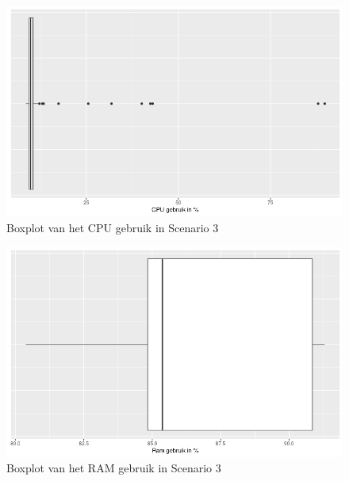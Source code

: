 \begin{figure}[h]
	\centering
	\includegraphics[width=0.75\linewidth]{img/SC3_CPUBox.png}
	\caption{Boxplot van het CPU gebruik in Scenario 3}
	\label{fig:SC3_CPUBox}
\end{figure}

\begin{figure}[h]
	\centering
	\includegraphics[width=0.75\linewidth]{img/SC3_RAMBox.png}
	\caption{Boxplot van het RAM gebruik in Scenario 3}
	\label{fig:SC3_RAMBox}
\end{figure}


